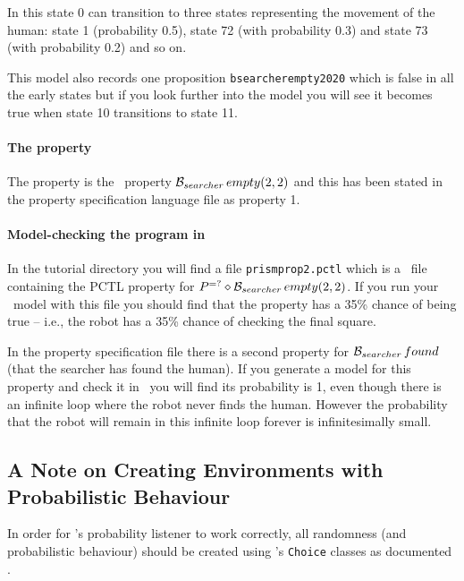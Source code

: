 In this state 0 can transition to three states representing the movement of the human: state 1 (probability 0.5), state 72 (with probability 0.3) and state 73 (with probability 0.2) and so on.

This model also records one proposition \texttt{bsearcherempty2020} which is false in all the early states but if you look further into the model you will see it becomes true when state 10 transitions to state 11.

\paragraph{The property} The property is the \ajpf\ property $\mathrm{{\cal B}}_{searcher} \, empty(2, 2)$ and this has been stated in the property specification language file as property 1. 

\paragraph{Model-checking the program in \prism}  In the tutorial directory you will find a file \texttt{prismprop2.pctl} which is a \prism\ file containing the PCTL property for $P^{=?}\diamond \mathrm{{\cal B}}_{searcher} \, empty(2, 2)$.  If you run your \prism\ model with this file you should find that the property has a 35\% chance of being true -- i.e., the robot has a 35\% chance of checking the final square.

In the property specification file there is a second property for $\mathrm{{\cal B}}_{searcher} \, found$ (that the searcher has found the human).  If you generate a model for this property and check it in \prism\ you will find its probability is 1, even though there is an infinite loop where the robot never finds the human.   However the probability that the robot will remain in this infinite loop forever is infinitesimally small.

\subsection{A Note on Creating Environments with Probabilistic Behaviour}

In order for \ajpf's probability listener to work correctly, all randomness (and probabilistic behaviour) should be created using \ail's \texttt{Choice} classes as documented .  

